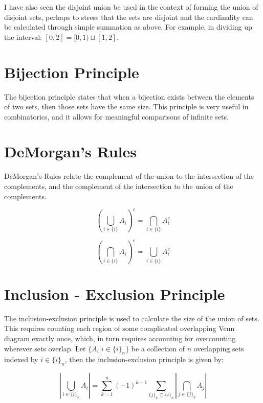 I have also seen the disjoint union be used in the context of forming the union of disjoint sets, perhaps to stress that the sets are disjoint and the cardinality can be calculated through simple summation as above. For example, in dividing up the interval: $[0,2]=[0,1)\sqcup[1,2]$.


\section{Bijection Principle}
The bijection principle states that when a bijection exists between the elements of two sets, then those sets have the same size. This principle is very useful in combinatorics, and it allows for meaningful comparisons of infinite sets.


\section{DeMorgan's Rules}
\label{sec:demorgan}
DeMorgan's Rules relate the complement of the union to the intersection of the complements, and the complement of the intersection to the union of the complements.

\begin{equation}
\left(\bigcup_{i\in\{i\}}A_i\right)^c = \bigcap_{i\in\{i\}}A^c_i
\end{equation}

\begin{equation}
\left(\bigcap_{i\in\{i\}}A_i\right)^c = \bigcup_{i\in\{i\}}A^c_i
\end{equation}


\section{Inclusion - Exclusion Principle}
\label{sec:inclusionexclusion}

The inclusion-exclusion principle is used to calculate the size of the union of sets. This requires counting each region of some complicated overlapping Venn diagram exactly once, which, in turn requires accounting for overcounting wherever sets overlap. Let $\{A_i | i\in \{i\}_n \}$ be a collection of $n$ overlapping sets indexed by $i\in \{i\}_n$, then the inclusion-exclusion principle is given by:

\begin{equation}
\left|\bigcup_{i\in\{i\}_n} A_i\right| = \sum^n_{k=1} (-1)^{k-1} \sum_{\{j\}_k \subseteq \{i\}_n} \left|\bigcap_{j\in\{j\}_k} A_j\right|
\end{equation}


